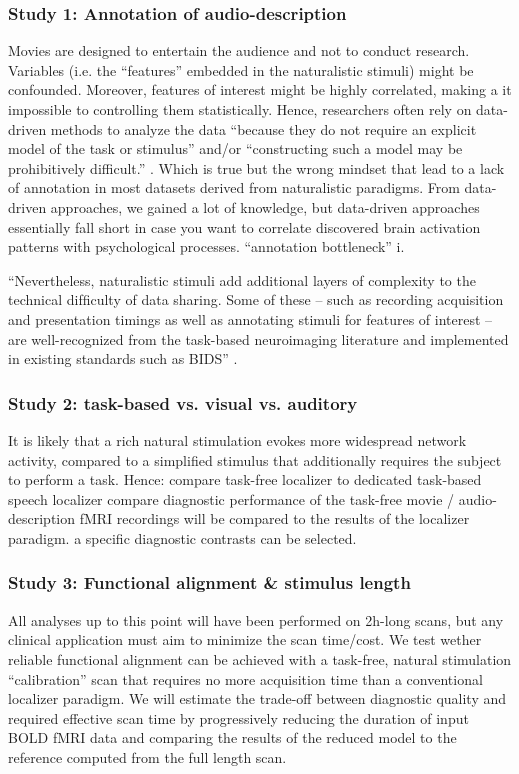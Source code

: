 \subsubsection{Study 1: Annotation of audio-description}



%
Movies are designed to entertain the audience and not to conduct research.
%
Variables (i.e. the ``features'' embedded in the naturalistic stimuli) might be
confounded.
%
Moreover, features of interest might be highly correlated, making a it
impossible to controlling them statistically.
%
Hence, researchers often rely on data-driven methods to analyze the data
``because they do not require an explicit model of the task or stimulus'' and/or
``constructing such a model may be prohibitively difficult.''
\citep{nastase2019measuring}.
%
Which is true but the wrong mindset that lead to a lack of annotation in most
datasets derived from naturalistic paradigms.
%
From data-driven approaches, we gained a lot of knowledge, but data-driven
approaches essentially fall short in case you want to correlate discovered brain
activation patterns with psychological processes.
%
``annotation bottleneck'' \citep{aliko2020naturalistic}i.

``Nevertheless, naturalistic stimuli add additional layers of complexity to the
technical difﬁculty of data sharing. Some of these – such as recording
acquisition and presentation timings as well as annotating stimuli for features
of interest – are well-recognized from the task-based neuroimaging literature
and implemented in existing standards such as BIDS'' \citep{dupre2020nature}.


\subsubsection{Study 2: task-based vs. visual vs. auditory}
%
It is likely that a rich natural stimulation evokes more widespread
network activity, compared to a simplified stimulus that additionally requires
the subject to perform a task.
%
Hence: compare task-free localizer to dedicated task-based speech localizer
%
compare diagnostic performance of the task-free movie / audio-description fMRI
recordings will be compared to the results of the localizer paradigm.
%
a specific diagnostic contrasts can be selected.

\subsubsection{Study 3: Functional alignment \& stimulus length}
%
All analyses up to this point will have been performed on 2h-long
scans, but any clinical application must aim to minimize the scan time/cost.
%
We test wether reliable functional alignment can be achieved with a task-free,
natural stimulation ``calibration” scan that requires no more acquisition time
than a conventional localizer paradigm.
%
We will estimate the trade-off between diagnostic quality
and required effective scan time by progressively reducing the duration of input
BOLD fMRI data and comparing the results of the reduced model to the reference
computed from the full length scan.

